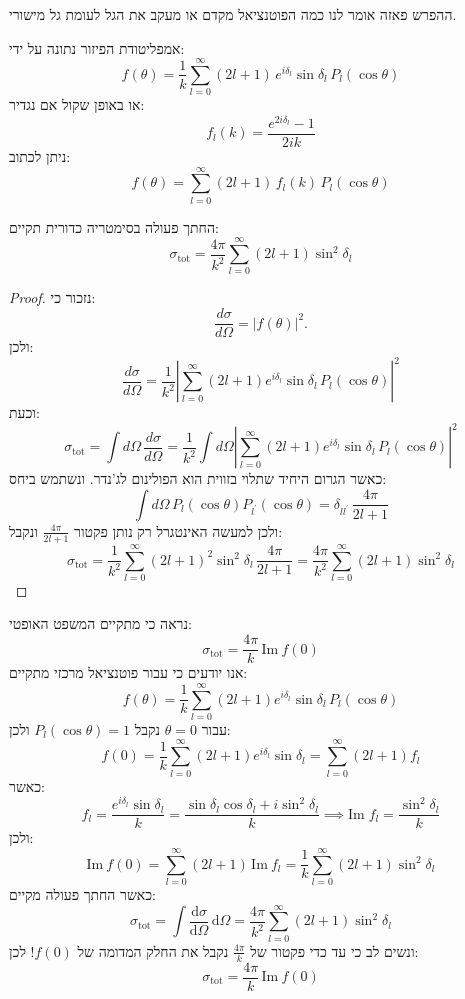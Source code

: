 \documentclass{tstextbook}
\begin{document}
\begin{remark}
ההפרש פאזה אומר לנו כמה הפוטנציאל מקדם או מעקב את הגל לעומת גל מישורי.

\end{remark}
\begin{proposition}
אמפליטודת הפיזור נתונה על ידי:
$$f(\theta)=\frac{1}{k}\sum_{l=0}^{\infty}(2l+1)\,e^{i\delta_{l}}\sin\delta_{l}\,P_{l}(\cos\theta)$$
או באופן שקול אם נגדיר:
$$f_{l}(k)=\frac{e^{2i\delta_{l}}-1}{2i k}$$
ניתן לכתוב:
$$f(\theta)=\sum_{l=0}^{\infty}(2l+1)\,f_{l}(k)\,P_{l}(\cos\theta)$$

\end{proposition}
\begin{proposition}
החתך פעולה בסימטריה כדורית תקיים:
$$\sigma_{\mathrm{tot}}=\frac{4\pi}{k^{2}}\sum_{l=0}^{\infty}(2l+1)\sin^{2}\delta_{l}$$

\end{proposition}
\begin{proof}
נזכור כי:
$$\frac{d\sigma}{d\Omega}=|f(\theta)|^{2}.$$
ולכן:
$$\frac{d\sigma}{d\Omega}=\frac{1}{k^{2}}\left|\sum_{l=0}^{\infty}(2l+1)e^{i\delta_{l}}\sin\delta_{l}\,P_{l}(\cos\theta)\right|^{2}$$
וכעת:
$$\sigma_{\mathrm{tot}}=\int d\Omega\,\frac{d\sigma}{d\Omega}=\frac{1}{k^{2}}\int d\Omega\left|\sum_{l=0}^{\infty}(2l+1)e^{i\delta_{l}}\sin\delta_{l}\,P_{l}(\cos\theta)\right|^{2}$$
כאשר הגרום היחיד שתלוי בזווית הוא הפולינום לג'נדר. ונשתמש ביחס:
$$\int d\Omega\,P_{l}(\cos\theta)P_{l^{\prime}}(\cos\theta)=\delta_{l l^{\prime}}\,\frac{4\pi}{2l+1}$$
ולכן למעשה האינטגרל רק נותן פקטור \(\frac{4\pi}{2l+1}\) ונקבל:
$$\sigma_{\mathrm{tot}}=\frac{1}{k^{2}}\sum_{l=0}^{\infty}(2l+1)^{2}\sin^{2}\delta_{l}\,\frac{4\pi}{2l+1}=\frac{4\pi}{k^{2}}\sum_{l=0}^{\infty}(2l+1)\sin^{2}\delta_{l}$$

\end{proof}
\begin{example}
נראה כי מתקיים המשפט האופטי:
$$\sigma_{\mathrm{tot}}={\frac{4\pi}{k}}\,\mathrm{Im}\ f(0)$$
אנו יודעים כי עבור פוטנציאל מרכזי מתקיים:
$$f(\theta)=\frac{1}{k}\sum_{l=0}^{\infty}(2l+1)e^{i\delta_{l}}\sin\delta_{l}\,P_{l}(\cos\theta)$$
עבור \(\theta=0\) נקבל \(P_{l}\left( \cos \theta \right)=1\) ולכן:
$$f(0)=\frac{1}{k}\sum_{l=0}^{\infty}(2l+1)e^{i\delta_{l}}\sin\delta_{l}=\sum_{l=0}^{\infty}(2l+1)f_{l}$$
כאשר:
$$f_{l}=\frac{e^{i\delta_{l}}\sin\delta_{l}}{k}=\frac{\sin \delta_{l}\cos \delta_{l}+i\sin ^{2}\delta_{l}}{k}\implies\mathrm{Im}\;f_{l}=\frac{\sin^{2}\delta_{l}}{k}$$
ולכן:
$$\mathrm{Im}\ f(0)=\sum_{l=0}^{\infty}(2l+1)\,\mathrm{Im}\ f_{l}=\frac{1}{k}\sum_{l=0}^{\infty}(2l+1)\sin^{2}\delta_{l}$$
כאשר החתך פעולה מקיים:
$$\sigma_{\mathrm{tot}}=\int{\frac{\mathrm{d}\sigma}{\mathrm{d}\Omega}}\,\mathrm{d}\Omega={\frac{4\pi}{k^{2}}}\sum_{l=0}^{\infty}(2l+1)\sin^{2}\delta_{l}$$
ונשים לב כי עד כדי פקטור של \(\frac{4\pi}{k}\) נקבל את החלק המדומה של \(f(0)\)! לכן:
$$\sigma_{\mathrm{tot}}=\frac{4\pi}{k}\,\mathrm{Im}\ f(0)$$

\end{example}
\end{document}
